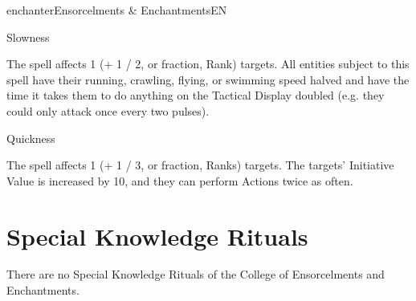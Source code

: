 \begin{College}[1.1]{enchanter}{Ensorcelments \& Enchantments}{EN}
\begin{spell}[S-11]{Slowness}

\begin{effects}
The spell affects 1 (+ 1 / 2, or fraction, Rank) targets.  All
entities subject to this spell have their running, crawling, flying,
or swimming speed halved and have the time it takes them to do
anything on the Tactical Display doubled (e.g.  they could only attack
once every two pulses).
\end{effects}
\end{spell}

\begin{spell}[S-12]{Quickness}

\begin{effects}
The spell affects 1 (+ 1 / 3, or fraction, Ranks) targets.  The
targets’ Initiative Value is increased by 10, and they can perform
Actions twice as often.
\end{effects}
\end{spell}


\section{Special Knowledge Rituals}

There are no Special Knowledge Rituals of the College of Ensorcelments
and Enchantments.

\end{College}
